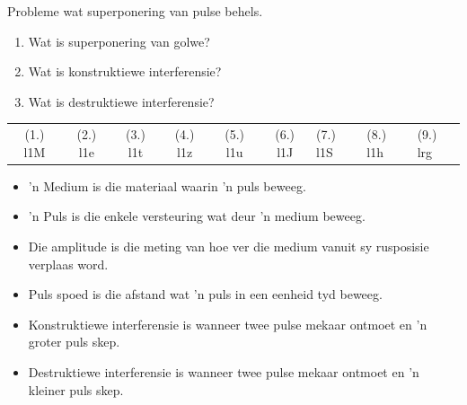 \begin{exercises}{Probleme wat superponering van pulse behels.}
\begin{enumerate}[noitemsep, label=\textbf{\arabic*}. ]
 \label{m38802*uid62}\item Wat is superponering van golwe?\newline
\label{m38802*uid64}\item Wat is konstruktiewe interferensie?\newline
\label{m38802*uid65}\item Wat is destruktiewe interferensie?\newline
        \end{enumerate}
  \label{m38802*eip-812}
\practiceinfo
 \par \begin{tabular}[h]{cccccc}
 (1.) l1M  &  (2.) l1e  &  (3.) l1t  &  (4.) l1z  &  (5.) l1u  &  (6.) l1J  &  (7.) l1S  &  (8.) l1h  &  (9.) lrg  & \end{tabular}

\end{exercises}
            \nopagebreak
            \label{m38802*eip-404}\begin{itemize}[noitemsep]
            \item 'n Medium is die materiaal waarin 'n puls beweeg.
	    \item 'n Puls is die enkele versteuring wat deur 'n medium beweeg. 
	    \item Die amplitude is die meting van hoe ver die medium vanuit sy rusposisie verplaas word. 
	    \item Puls spoed is die afstand wat 'n puls in een eenheid tyd beweeg.
	    \item Konstruktiewe interferensie is wanneer twee pulse mekaar ontmoet en 'n groter puls skep.
	    \item Destruktiewe interferensie is wanneer twee pulse mekaar ontmoet en 'n kleiner puls skep.
	    \end{itemize}
        \label{m38802*cid9}
